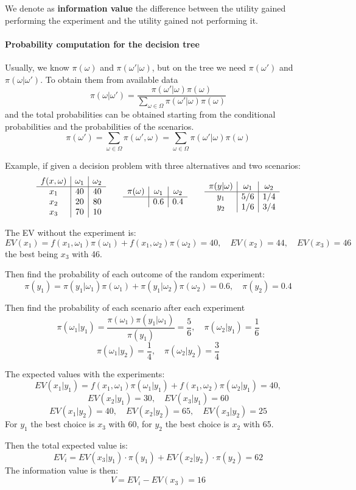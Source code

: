 We denote as \textbf{information value} the difference between the utility gained performing the experiment and the utility gained not performing it.

\paragraph{Probability computation for the decision tree} Usually, we know $\pi (\omega)$ and $\pi (\omega' | \omega)$, but on the tree we need $\pi (\omega')$ and $\pi (\omega | \omega')$. To obtain them from available data
$$ \pi(\omega | \omega') = \frac{\pi (\omega' | \omega) \pi (\omega)}{\sum_{\omega \in \Omega} \pi (\omega' | \omega) \pi (\omega)}$$
and the total probabilities can be obtained starting from the conditional probabilities and the probabilities of the scenarios. 
$$ \pi (\omega') = \sum_{\omega \in \Omega} \pi (\omega', \omega) = \sum_{\omega \in \Omega} \pi (\omega' | \omega) \pi (\omega) $$

Example, if given a decision problem with three alternatives and two scenarios:
$$
\begin{array}{c|c|c}
	f(x, \omega) & \omega_1 & \omega_2 \\
	\hline
	x_1 & 40 & 40 \\
	x_2 & 20 & 80 \\
	x_3 & 70 & 10
\end{array}
\qquad
\begin{array}{c|c|c}
	\pi(\omega) & \omega_1 & \omega_2 \\
	\hline
	& 0.6 & 0.4
\end{array}
\qquad
\begin{array}{c|c|c}
	\pi(y|\omega) & \omega_1 & \omega_2 \\
	\hline
	y_1 & 5/6 & 1/4 \\
	y_2 & 1/6 & 3/4
\end{array}
$$

The EV without the experiment is: 
$$ EV(x_1) = f(x_1, \omega_1)\pi(\omega_1) + f(x_1, \omega_2) \pi (\omega_2) = 40, \quad EV(x_2) = 44, \quad EV(x_3) = 46 $$
the best being $x_3$ with 46.

Then find the probability of each outcome of the random experiment: 
$$ \pi(y_1) = \pi(y_1|\omega_1)\pi(\omega_1) + \pi(y_1|\omega_2)\pi(\omega_2) = 0.6, \quad \pi(y_2) = 0.4 $$

Then find the probability of each scenario after each experiment
$$ \pi(\omega_1|y_1) = \frac{\pi(\omega_1) \pi(y_1|\omega_1)}{\pi(y_1)} = \frac{5}{6}, \quad \pi(\omega_2|y_1) = \frac{1}{6} $$
$$ \pi(\omega_1|y_2) = \frac{1}{4}, \quad \pi(\omega_2|y_2) = \frac{3}{4} $$


The expected values with the experiments:
$$ EV(x_1|y_1) = f(x_1, \omega_1) \pi (\omega_1 | y_1) + f(x_1, \omega_2) \pi (\omega_2 | y_1) = 40, $$
$$ EV(x_2|y_1) = 30, \quad EV(x_3|y_1) = 60 $$
$$ EV(x_1|y_2) = 40, \quad EV(x_2|y_2) = 65, \quad EV(x_3|y_2) = 25 $$
For $y_1$ the best choice is $x_3$ with 60, for $y_2$ the best choice is $x_2$ with 65.

Then the total expected value is:
$$ EV_i = EV(x_3|y_1) \cdot \pi (y_1) + EV(x_2|y_2) \cdot \pi(y_2) = 62 $$
The information value is then:
$$ V = EV_i - EV(x_3) = 16 $$
